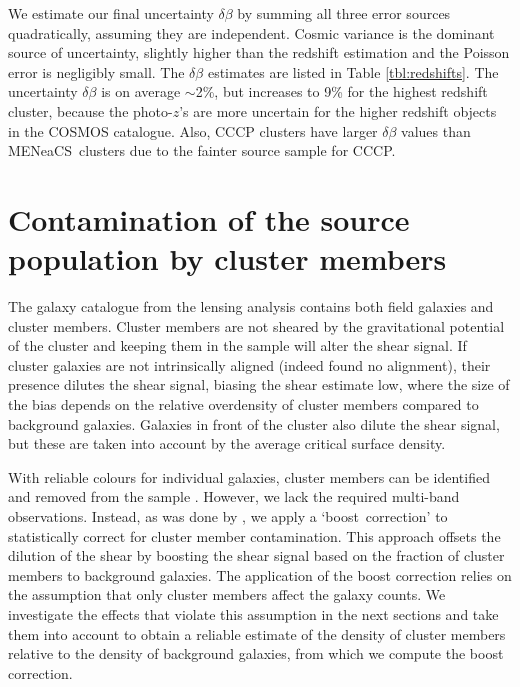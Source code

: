 \documentclass[useAMS,usenatbib]{mnras}
\newcommand{\mn}{MENeaCS}
\newcommand{\pz}{photo-$z$}
\begin{document}
We estimate our final uncertainty $\delta \beta$ by summing all three error sources quadratically, assuming they are independent. 
Cosmic variance is the dominant source of uncertainty, slightly higher than the redshift estimation and the Poisson error is negligibly small. The $\delta \beta$ estimates are listed in Table \ref{tbl:redshifts}. The uncertainty $\delta \beta$ is on average $\sim$2\%, but increases to 9\% for the highest redshift cluster, because the \pz's are more uncertain for the higher redshift objects in the COSMOS catalogue. Also, CCCP clusters have larger $\delta \beta$ values than \mn \ clusters due to the fainter source sample for CCCP.




\section{Contamination of the source population by cluster members}
\label{sec:contamination}

The galaxy catalogue from the lensing analysis contains both field galaxies and cluster members. Cluster members are not sheared by the gravitational potential of the cluster and keeping them in the sample will alter the shear signal. If cluster galaxies are not intrinsically aligned (indeed \citealt{sifon15} found no alignment), their presence dilutes the shear signal, biasing the shear estimate low, where the size of the bias depends on the relative overdensity of cluster members compared to background galaxies. %
Galaxies in front of the cluster also dilute the shear signal, but these are taken into account by the average critical surface density.

With reliable colours for individual galaxies, cluster members can be identified and removed from the sample \citep[e.g][]{medezinski18, varga19}. However, we lack the required multi-band observations. Instead, as was done by , we apply a `boost~correction' to statistically correct for cluster member contamination. This approach offsets the dilution of the shear by boosting the shear signal based on the fraction of cluster members to background galaxies. The application of the boost correction relies on the assumption that only cluster members affect the galaxy counts. We investigate the effects that violate this assumption in the next sections and take them into account to obtain a reliable estimate of the density of cluster members relative to the  density of background galaxies, from which we compute the boost correction. 
\end{document}
